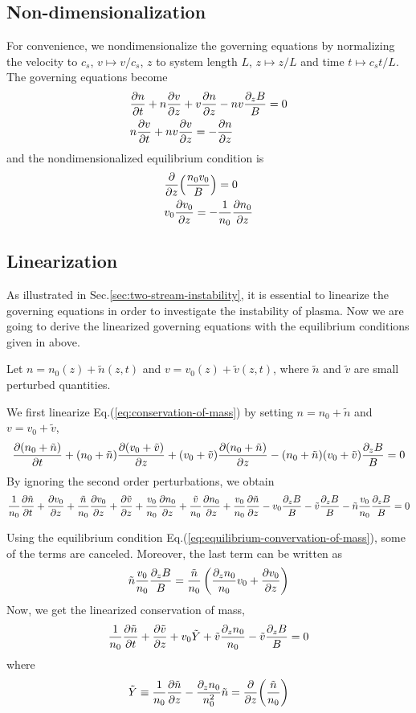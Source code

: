 \subsection{Non-dimensionalization}
For convenience, we nondimensionalize the governing equations by normalizing the velocity to $c_s$, $v\mapsto v/c_s$, $z$ to system length $L$, $z \mapsto z/L$ and time $t\mapsto c_s t/L$. The governing equations become
\begin{align}
    &\pdv{n}{t} + n\pdv{v}{z} + v\pdv{n}{z} - nv\frac{\partial_z B}{B} = 0 
	\label{eq:conservation-of-mass}
	\\
    &n\pdv{v}{t} + nv\pdv{v}{z} = -\pdv{n}{z}
	\label{eq:conservation-of-momentum}
\end{align}
and the nondimensionalized equilibrium condition is
\begin{align}
    &\pdv{z}(\frac{n_0v_0}{B}) = 0 \label{eq:equilibrium-convervation-of-mass}\\
    &v_0\pdv{v_0}{z} = -\frac{1}{n_0}\pdv{n_0}{z} \label{eq:equilibrium-convervation-of-momentum}
\end{align}

\subsection{Linearization}
As illustrated in Sec.\ref{sec:two-stream-instability}, it is essential to linearize the governing equations in order to investigate the instability of plasma. Now we are going to derive the linearized governing equations with the equilibrium conditions given in above.

Let $n = n_0(z) + \tilde{n}(z,t)$ and $v = v_0(z) + \tilde{v}(z,t)$, where $\tilde{n}$ and $\tilde{v}$ are small perturbed quantities.

We first linearize Eq.(\ref{eq:conservation-of-mass}) by setting $n=n_0+\tilde{n}$ and $v=v_0+\tilde{v}$,
\[    \pdv{(n_0+\tilde{n})}{t} 
	+ (n_0+\tilde{n})\pdv{(v_0+\tilde{v})}{z} 
	+ (v_0+\tilde{v})\pdv{(n_0+\tilde{n})}{z} 
	- (n_0+\tilde{n})(v_0+\tilde{v})\frac{\partial_z B}{B} = 0 
\]
By ignoring the second order perturbations, we obtain
\[ \frac{1}{n_0}\pdv{\tilde{n}}{t} 
+ \pdv{v_0}{z} + \frac{\tilde{n}}{n_0}\pdv{v_0}{z} + \pdv{\tilde{v}}{z}
+ \frac{v_0}{n_0}\pdv{n_0}{z} + \frac{\tilde{v}}{n_0}\pdv{n_0}{z} + \frac{v_0}{n_0}\pdv{\tilde{n}}{z} 
- v_0\frac{\partial_z B}{B} - \tilde{v}\frac{\partial_z B}{B} - \tilde{n}\frac{v_0}{n_0}\frac{\partial_z B}{B} = 0 
\]


Using the equilibrium condition Eq.(\ref{eq:equilibrium-convervation-of-mass}), some of the terms are canceled. Moreover, the last term can be written as 
\[ \tilde{n}\frac{v_0}{n_0}\frac{\partial_z B}{B} = \frac{\tilde{n}}{n_0}\left( \frac{\partial_z n_0}{n_0}v_0 + \pdv{v_0}{z} \right) \]
Now, we get the linearized conservation of mass,
\begin{equation} \label{eq:linearized-conservation-of-mass}
	\frac{1}{n_0}\pdv{\tilde{n}}{t} 
        + \pdv{\tilde{v}}{z} + v_0\tilde{Y} + \tilde{v}\frac{\partial_z n_0}{n_0} - \tilde{v}\frac{\partial_z B}{B} = 0 
\end{equation}
where 
\[ \tilde{Y} \equiv \frac{1}{n_0}\pdv{\tilde{n}}{z} - \frac{\partial_z n_0}{n_0^2}\tilde{n} = \pdv{z}(\frac{\tilde{n}}{n_0}) \] 

